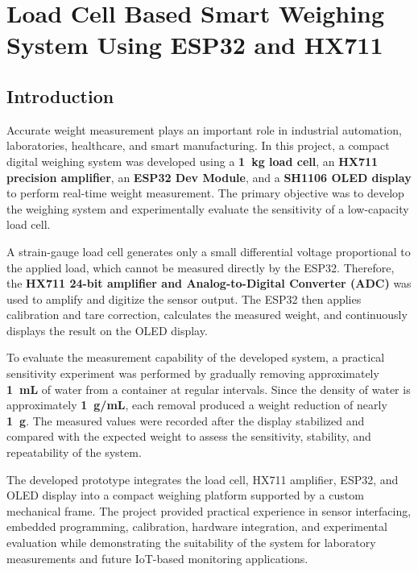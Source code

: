 \chapter{Load Cell Based Smart Weighing System Using ESP32 and HX711}


\section{Introduction}

Accurate weight measurement plays an important role in industrial automation, laboratories, healthcare, and smart manufacturing. In this project, a compact digital weighing system was developed using a \textbf{1~kg load cell}, an \textbf{HX711 precision amplifier}, an \textbf{ESP32 Dev Module}, and a \textbf{SH1106 OLED display} to perform real-time weight measurement. The primary objective was to develop the weighing system and experimentally evaluate the sensitivity of a low-capacity load cell.

A strain-gauge load cell generates only a small differential voltage proportional to the applied load, which cannot be measured directly by the ESP32. Therefore, the \textbf{HX711 24-bit amplifier and Analog-to-Digital Converter (ADC)} was used to amplify and digitize the sensor output. The ESP32 then applies calibration and tare correction, calculates the measured weight, and continuously displays the result on the OLED display.

To evaluate the measurement capability of the developed system, a practical sensitivity experiment was performed by gradually removing approximately \textbf{1~mL} of water from a container at regular intervals. Since the density of water is approximately \textbf{1~g/mL}, each removal produced a weight reduction of nearly \textbf{1~g}. The measured values were recorded after the display stabilized and compared with the expected weight to assess the sensitivity, stability, and repeatability of the system.

The developed prototype integrates the load cell, HX711 amplifier, ESP32, and OLED display into a compact weighing platform supported by a custom mechanical frame. The project provided practical experience in sensor interfacing, embedded programming, calibration, hardware integration, and experimental evaluation while demonstrating the suitability of the system for laboratory measurements and future IoT-based monitoring applications.

